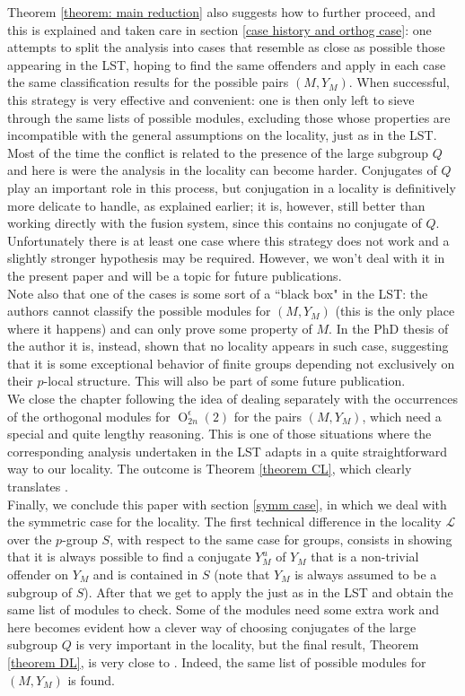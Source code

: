 \documentclass{amsart}
\numberwithin{equation}{section}
\theoremstyle{definition}
\theoremstyle{subresult}
\theoremstyle{caseresult}
\renewcommand{\L}{\mathcal{L}}
\renewcommand{\O}{\operatorname{O}}
\newcommand{\<}{\langle}
\renewcommand{\>}{\rangle}
\begin{document}
Theorem \ref{theorem: main reduction} also suggests how to further proceed, and this is explained and taken care in section \ref{case history and orthog case}: one attempts to split the analysis into cases that resemble as close as possible those appearing in the LST, hoping to find the same offenders and apply in each case the same classification results for the possible pairs $(M,Y_M)$. When successful, this strategy is very effective and convenient: one is then only left to sieve through the same lists of possible modules, excluding those whose properties are incompatible with the general assumptions on the locality, just as in the LST. Most of the time the conflict is related to the presence of the large subgroup $Q$ and here is were the analysis in the locality can become harder. Conjugates of $Q$ play an important role in this process, but conjugation in a locality is definitively more delicate to handle, as explained earlier; it is, however, still better than working directly with the fusion system, since this contains no conjugate of $Q$. Unfortunately there is at least one case where this strategy does not work and a slightly stronger hypothesis may be required. However, we won't deal with it in the present paper and will be a topic for future publications.\\
Note also that one of the cases is some sort of a ``black box" in the LST: the authors cannot classify the possible modules for $(M,Y_M)$ (this is the only place where it happens) and can only prove some property of $M$. In the PhD thesis of the author it is, instead, shown that no locality appears in such case, suggesting that it is some exceptional behavior of finite groups depending not exclusively on their $p$-local structure. This will also be part of some future publication.\\
We close the chapter following the idea of dealing separately with the occurrences of the orthogonal modules for $\O_{2n}^{\epsilon}(2)$ for the pairs $(M,Y_M)$, which need a special and quite lengthy reasoning. This is one of those situations where the corresponding analysis undertaken in the LST adapts in a quite straightforward way to our locality. The outcome is Theorem \ref{theorem CL}, which clearly translates \cite[Theorem C]{Meier-Stell-Stroth:2012}.\\

Finally, we conclude this paper with section \ref{symm case}, in which we deal with the symmetric case for the locality. The first technical difference in the locality $\L$ over the $p$-group $S$, with respect to the same case for groups, consists in showing that it is always possible to find a conjugate $Y_M^u$ of $Y_M$ that is a non-trivial offender on $Y_M$ and is contained in $S$ (note that $Y_M$ is always assumed to be a subgroup of $S$). After that we get to apply the  just as in the LST and obtain the same list of modules to check. Some of the modules need some extra work and here becomes evident how a clever way of choosing conjugates of the large subgroup $Q$ is very important in the locality, but the final result, Theorem \ref{theorem DL}, is very close to \cite[Theorem D]{Meier-Stell-Stroth:2012}. Indeed, the same list of possible modules for $(M,Y_M)$ is found.\\
\end{document}
